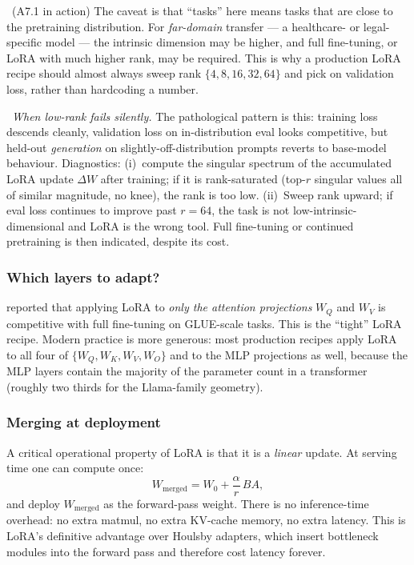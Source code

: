 \Assum\ (A7.1 in action) The caveat is that ``tasks'' here means tasks
that are close to the pretraining distribution. For \emph{far-domain}
transfer --- a healthcare- or legal-specific model --- the intrinsic
dimension may be higher, and full fine-tuning, or LoRA with much higher
rank, may be required. This is why a production LoRA recipe should
almost always sweep rank $\{4, 8, 16, 32, 64\}$ and pick on validation
loss, rather than hardcoding a number.

\Cons\ \emph{When low-rank fails silently.} The pathological pattern is
this: training loss descends cleanly, validation loss on in-distribution
eval looks competitive, but held-out \emph{generation} on
slightly-off-distribution prompts reverts to base-model behaviour.
Diagnostics: (i)~compute the singular spectrum of the accumulated
LoRA update $\Delta W$ after training; if it is rank-saturated (top-$r$
singular values all of similar magnitude, no knee), the rank is too
low. (ii)~Sweep rank upward; if eval loss continues to improve past
$r=64$, the task is not low-intrinsic-dimensional and LoRA is the
wrong tool. Full fine-tuning or continued pretraining is then
indicated, despite its cost.

\subsubsection{Which layers to adapt?}

\citet{hu2021lora} reported that applying LoRA to \emph{only the
attention projections} $W_Q$ and $W_V$ is competitive with full
fine-tuning on GLUE-scale tasks. This is the ``tight'' LoRA recipe.
Modern practice is more generous: most production recipes apply LoRA
to all four of $\{W_Q, W_K, W_V, W_O\}$ and to the MLP projections
as well, because the MLP layers contain the majority of the
parameter count in a transformer (roughly two thirds for the
Llama-family geometry).

\subsubsection{\label{subsec:lora-merge}Merging at deployment}

A critical operational property of LoRA is that it is a
\emph{linear} update. At serving time one can compute once:
\begin{equation}
  W_\text{merged} = W_0 + \frac{\alpha}{r}\, B A,
\end{equation}
and deploy $W_\text{merged}$ as the forward-pass weight. There is no
inference-time overhead: no extra matmul, no extra KV-cache memory,
no extra latency. This is LoRA's definitive advantage over Houlsby
adapters, which insert bottleneck modules into the forward pass and
therefore cost latency forever.

